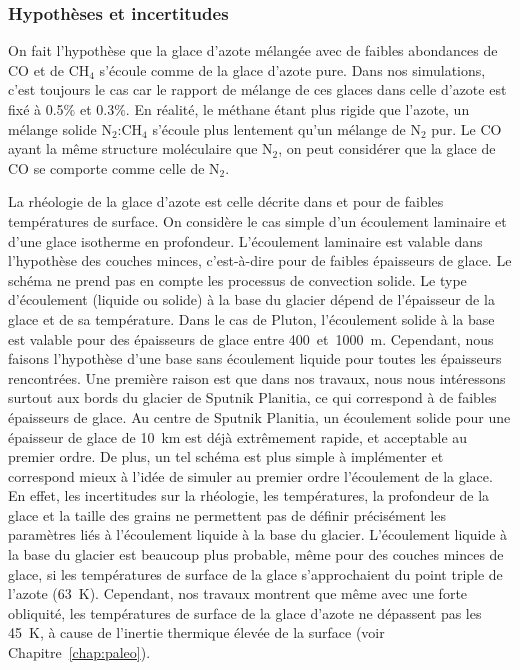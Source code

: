 \subsubsection{Hypothèses et incertitudes}

On fait l’hypothèse que la glace d’azote mélangée avec de faibles abondances de CO et de CH$_4$ s’écoule comme de la glace d’azote pure. Dans nos simulations, c’est toujours le cas car le rapport de mélange de ces glaces dans celle d’azote est fixé à 0.5$\%$ et 0.3$\%$. En réalité, le méthane étant plus rigide que l’azote, un mélange solide N$_2$:CH$_4$ s’écoule plus lentement qu’un mélange de N$_2$ pur. Le CO ayant la même structure moléculaire que N$_2$, on peut considérer que la glace de CO se comporte comme celle de N$_2$.

La rhéologie de la glace d’azote est celle décrite dans \citet{Yama:10} et \citet{Umur:17} pour de faibles températures de surface. On considère le cas simple d’un écoulement laminaire et d’une glace isotherme en profondeur. 
L’écoulement laminaire est valable dans l’hypothèse des couches minces, c’est-à-dire pour de faibles épaisseurs de glace. Le schéma ne prend pas en compte les processus de convection solide.  Le type d’écoulement (liquide ou solide) à la base du glacier dépend de l’épaisseur de la glace et de sa température. Dans le cas de Pluton, l’écoulement solide à la base est valable pour des épaisseurs de glace entre 400~et~1000~m. Cependant, nous faisons l'hypothèse d'une base sans écoulement liquide pour toutes les épaisseurs rencontrées.
Une première raison est que dans nos travaux, nous nous intéressons surtout aux bords du glacier de Sputnik Planitia, ce qui correspond à de faibles épaisseurs de glace. Au centre de Sputnik Planitia, un écoulement solide pour une épaisseur de glace de 10~km est déjà extrêmement rapide, et acceptable au premier ordre. De plus, un tel schéma est plus simple à implémenter et correspond mieux à l’idée de simuler au premier ordre l’écoulement de la glace. En effet, les incertitudes sur la rhéologie, les températures, la profondeur de la glace et la taille des grains ne permettent pas de définir précisément les paramètres liés à l’écoulement liquide à la base du glacier.  
L’écoulement liquide à la base du glacier est beaucoup plus probable, même pour des couches minces de glace, si les températures de surface de la glace s’approchaient du point triple de l’azote (63~K). Cependant, nos travaux montrent que même avec une forte obliquité, les températures de surface de la glace d’azote ne dépassent pas les 45~K, à cause de l’inertie thermique élevée de la surface (voir Chapitre~\ref{chap:paleo}). 

